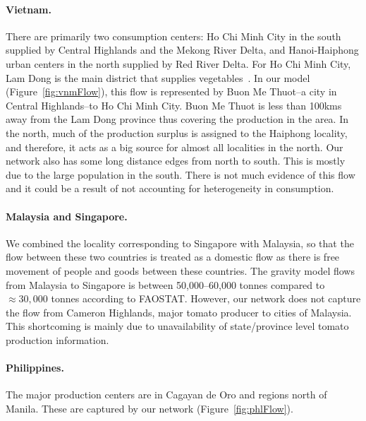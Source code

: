 \documentclass[10pt]{article}
\theoremstyle{definition}
\begin{document}
\paragraph{Vietnam.}
There are primarily two consumption centers: Ho Chi Minh City in the south
supplied by Central Highlands and the Mekong River Delta, and
Hanoi-Haiphong urban centers in the north supplied by Red River Delta. For
Ho Chi Minh City, Lam Dong is the main district that supplies
vegetables~\cite{cadilhon2006}.  In our model (Figure~\ref{fig:vnmFlow}),
this flow is represented by Buon Me Thuot--a city in Central Highlands--to
Ho Chi Minh City. Buon Me Thuot is less than 100kms away from the Lam Dong
province thus covering the production in the area. In the north, much of
the production surplus is assigned to the Haiphong locality, and therefore,
it acts as a big source for almost all localities in the north. Our network
also has some long distance edges from north to south. This is mostly due
to the large population in the south. There is not much evidence of this
flow and it could be a result of not accounting for heterogeneity in
consumption.
\paragraph{Malaysia and Singapore.} We combined the locality corresponding
to Singapore with Malaysia, so that the flow between these two countries is
treated as a domestic flow as there is free movement of people and goods
between these countries. The gravity model flows from Malaysia to Singapore
is between 50,000--60,000 tonnes compared to $\approx30,000$ tonnes
according to FAOSTAT. However, our network does not capture the flow from
Cameron Highlands, major tomato producer to cities of Malaysia. This
shortcoming is mainly due to unavailability of state/province level tomato
production information.
\paragraph{Philippines.} The major production centers are in Cagayan de Oro
and regions north of Manila. These are captured by our network
(Figure~\ref{fig:phlFlow}).
\end{document}
